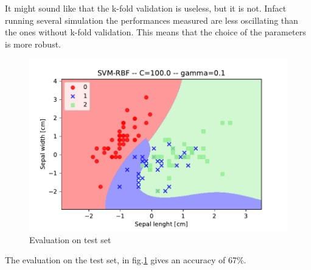 \documentclass[10pt,a4paper]{article}
\begin{document}
It might sound like that the k-fold validation is useless, but it is not. Infact running several simulation the performances measured are less oscillating than the ones without k-fold validation. This means that the choice of the parameters is more robust.

\begin{figure}
\centering
\includegraphics[width=0.7\linewidth]{../Images/rbf_C100G01_best_k}
\caption{Evaluation on test set}
\label{fig:rbf_C100G01_best_k}
\end{figure}

The evaluation on the test set, in fig.\ref{fig:rbf_C100G01_best_k} gives an accuracy of 67\%.
\end{document}
